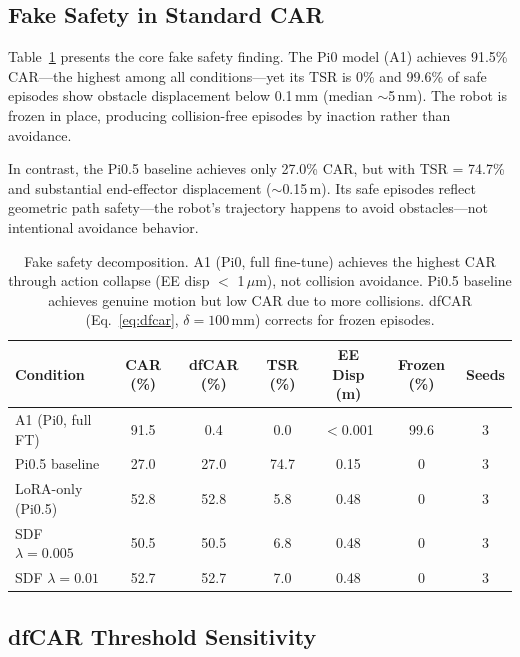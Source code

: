 \documentclass[letterpaper]{article}
\begin{document}
\subsection{Fake Safety in Standard CAR}
\label{sec:fake-safety}

Table~\ref{tab:fake-safety} presents the core fake safety finding. The Pi0 model (A1) achieves 91.5\% CAR---the highest among all conditions---yet its TSR is 0\% and 99.6\% of safe episodes show obstacle displacement below 0.1\,mm (median ${\sim}$5\,nm). The robot is frozen in place, producing collision-free episodes by inaction rather than avoidance.

In contrast, the Pi0.5 baseline achieves only 27.0\% CAR, but with TSR = 74.7\% and substantial end-effector displacement (${\sim}$0.15\,m). Its safe episodes reflect geometric path safety---the robot's trajectory happens to avoid obstacles---not intentional avoidance behavior.

\begin{table}[t]
\centering
\caption{Fake safety decomposition. A1 (Pi0, full fine-tune) achieves the highest CAR through action collapse (EE disp $<$ 1\,$\mu$m), not collision avoidance. Pi0.5 baseline achieves genuine motion but low CAR due to more collisions. dfCAR (Eq.~\ref{eq:dfcar}, $\delta = 100$\,mm) corrects for frozen episodes.}
\label{tab:fake-safety}
\begin{tabular}{lcccccc}
\toprule
Condition & CAR (\%) & dfCAR (\%) & TSR (\%) & EE Disp (m) & Frozen (\%) & Seeds \\
\midrule
A1 (Pi0, full FT) & 91.5 & 0.4 & 0.0 & $<$0.001 & 99.6 & 3 \\
Pi0.5 baseline & 27.0 & 27.0 & 74.7 & 0.15 & 0 & 3 \\
LoRA-only (Pi0.5) & 52.8 & 52.8 & 5.8 & 0.48 & 0 & 3 \\
SDF $\lambda{=}0.005$ & 50.5 & 50.5 & 6.8 & 0.48 & 0 & 3 \\
SDF $\lambda{=}0.01$ & 52.7 & 52.7 & 7.0 & 0.48 & 0 & 3 \\
\bottomrule
\end{tabular}
\end{table}


\subsection{dfCAR Threshold Sensitivity}
\label{sec:dfcar}
\end{document}
